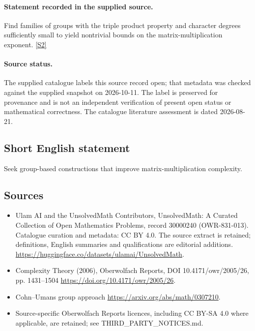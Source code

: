 \documentclass[11pt]{article}
\newcommand{\sref}[2]{\hyperlink{source:#1:#2}{[S#2]}}
\begin{document}
\paragraph{Statement recorded in the supplied source.}
Find families of groups with the triple product property and character degrees sufficiently small to yield nontrivial bounds on the matrix-multiplication exponent. \sref{30000240}{2}
\paragraph{Source status.}
The supplied catalogue labels this source record open; that metadata was checked against the supplied snapshot on 2026-10-11. The label is preserved for provenance and is not an independent verification of present open status or mathematical correctness. The catalogue literature assessment is dated 2026-08-21.
\subsection{Short English statement}
Seek group-based constructions that improve matrix-multiplication complexity.
\subsection{Sources}
\begin{itemize}
\item[\hypertarget{source:30000240:1}{S1}] Ulam AI and the UnsolvedMath Contributors, UnsolvedMath: A Curated Collection of Open Mathematics Problems, record 30000240 (OWR-831-013). Catalogue curation and metadata: CC BY 4.0. The source extract is retained; definitions, English summaries and qualifications are editorial additions.
\url{https://huggingface.co/datasets/ulamai/UnsolvedMath}.
\item[\hypertarget{source:30000240:2}{S2}] Complexity Theory (2006), Oberwolfach Reports, DOI 10.4171/owr/2005/26, pp. 1431--1504
\url{https://doi.org/10.4171/owr/2005/26}.
\item[\hypertarget{source:30000240:3}{S3}] Cohn--Umans group approach
\url{https://arxiv.org/abs/math/0307210}.
\item Source-specific Oberwolfach Reports licences, including CC BY-SA 4.0 where applicable, are retained; see THIRD\_PARTY\_NOTICES.md.
\end{itemize}
\end{document}
